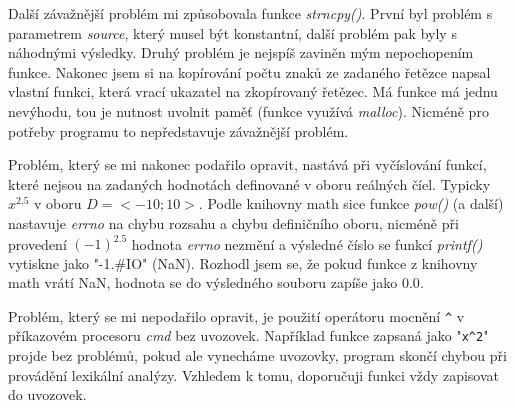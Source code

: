\documentclass 	[a4paper,12pt]	{article}
\begin{document}
Další závažnější problém mi způsobovala funkce \emph{strncpy()}. První byl problém s parametrem \emph{source}, který musel být konstantní, další problém pak byly s náhodnými výsledky. Druhý problém je nejspíš zaviněn mým nepochopením funkce. Nakonec jsem si na kopírování počtu znaků ze zadaného řetězce napsal vlastní funkci, která vrací ukazatel na zkopírovaný řetězec. Má funkce má jednu nevýhodu, tou je nutnost uvolnit paměť (funkce využívá \emph{malloc}). Nicméně pro potřeby programu to nepředstavuje závažnější problém.

Problém, který se mi nakonec podařilo opravit, nastává při vyčíslování funkcí, které nejsou na zadaných hodnotách definované v oboru reálných číel. Typicky $x^{2.5}$ v oboru $D=<-10;10>$. Podle knihovny math sice funkce \emph{pow()} (a další) nastavuje \emph{errno} na chybu rozsahu a chybu definičního oboru, nicméně při provedení $(-1)^{2.5}$ hodnota \emph{errno} nezmění a výsledné číslo se funkcí \emph{printf()} vytiskne jako "-1.\#IO" (NaN). Rozhodl jsem se, že pokud funkce z knihovny math vrátí NaN, hodnota se do výsledného souboru zapíše jako $0.0$.

Problém, který se mi nepodařilo opravit, je použití operátoru mocnění \verb|^|  v příkazovém procesoru \emph{cmd} bez uvozovek. Například funkce zapsaná jako "\verb|x^2|" projde bez problémů, pokud ale vynecháme uvozovky, program skončí chybou při provádění lexikální analýzy. Vzhledem k tomu, doporučuji funkci vždy zapisovat do uvozovek.
\end{document}
